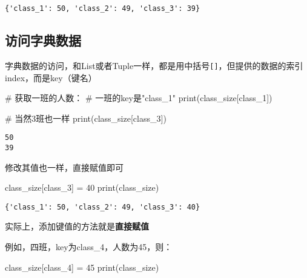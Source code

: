 \documentclass[
  letterpaper,
  DIV=11,
  numbers=noendperiod]{scrreprt}
\newenvironment{Shaded}{\begin{snugshade}}{\end{snugshade}}
\newcommand{\BuiltInTok}[1]{\textcolor[rgb]{0.00,0.23,0.31}{#1}}
\newcommand{\CommentTok}[1]{\textcolor[rgb]{0.37,0.37,0.37}{#1}}
\newcommand{\DecValTok}[1]{\textcolor[rgb]{0.68,0.00,0.00}{#1}}
\newcommand{\NormalTok}[1]{\textcolor[rgb]{0.00,0.23,0.31}{#1}}
\newcommand{\OperatorTok}[1]{\textcolor[rgb]{0.37,0.37,0.37}{#1}}
\newcommand{\StringTok}[1]{\textcolor[rgb]{0.13,0.47,0.30}{#1}}
\begin{document}
\begin{verbatim}
{'class_1': 50, 'class_2': 49, 'class_3': 39}
\end{verbatim}

\hypertarget{ux8bbfux95eeux5b57ux5178ux6570ux636e}{%
\subsection{访问字典数据}\label{ux8bbfux95eeux5b57ux5178ux6570ux636e}}

字典数据的访问，和List或者Tuple一样，都是用中括号\texttt{{[}{]}}，但提供的数据的索引index，而是key（键名）

\begin{Shaded}
\begin{Highlighting}[]
\CommentTok{\# 获取一班的人数：}
\CommentTok{\# 一班的key是"class\_1"}
\BuiltInTok{print}\NormalTok{(class\_size[}\StringTok{\textquotesingle{}class\_1\textquotesingle{}}\NormalTok{])}

\CommentTok{\# 当然3班也一样}
\BuiltInTok{print}\NormalTok{(class\_size[}\StringTok{\textquotesingle{}class\_3\textquotesingle{}}\NormalTok{])}
\end{Highlighting}
\end{Shaded}

\begin{verbatim}
50
39
\end{verbatim}

修改其值也一样，直接赋值即可

\begin{Shaded}
\begin{Highlighting}[]
\NormalTok{class\_size[}\StringTok{\textquotesingle{}class\_3\textquotesingle{}}\NormalTok{] }\OperatorTok{=} \DecValTok{40}
\BuiltInTok{print}\NormalTok{(class\_size)}
\end{Highlighting}
\end{Shaded}

\begin{verbatim}
{'class_1': 50, 'class_2': 49, 'class_3': 40}
\end{verbatim}

实际上，添加键值的方法就是\textbf{直接赋值}

例如，四班，key为class\_4，人数为45，则：

\begin{Shaded}
\begin{Highlighting}[]
\NormalTok{class\_size[}\StringTok{\textquotesingle{}class\_4\textquotesingle{}}\NormalTok{] }\OperatorTok{=} \DecValTok{45}
\BuiltInTok{print}\NormalTok{(class\_size)}
\end{Highlighting}
\end{Shaded}
\end{document}
